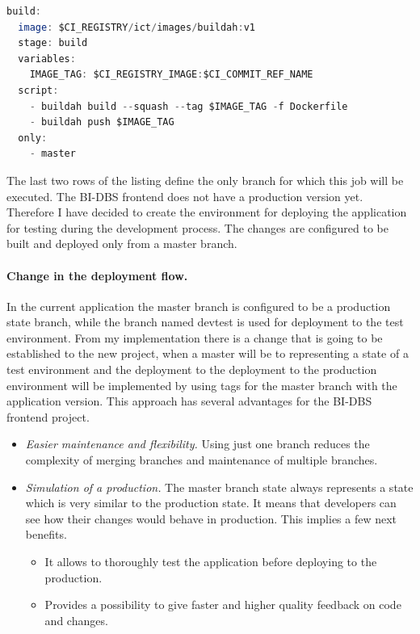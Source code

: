 \begin{lstlisting}[language=Octave, caption=Build stage in the CI/CD pipeline]
build:
  image: $CI_REGISTRY/ict/images/buildah:v1
  stage: build
  variables:
    IMAGE_TAG: $CI_REGISTRY_IMAGE:$CI_COMMIT_REF_NAME
  script:
    - buildah build --squash --tag $IMAGE_TAG -f Dockerfile
    - buildah push $IMAGE_TAG
  only:
    - master
\end{lstlisting}

\noindent The last two rows of the listing define the only branch for which this job will be executed. The BI-DBS frontend does not have a production version yet. Therefore I have decided to create the environment for deploying the application for testing during the development process. The changes are configured to be built and deployed only from a master branch.

\paragraph*{Change in the deployment flow.} In the current application the master branch is configured to be a production state branch, while the branch named devtest is used for deployment to the test environment. From my implementation there is a change that is going to be established to the new project, when a master will be to representing a state of a test environment and the deployment to the deployment to the production environment will be implemented by using tags for the master branch with the application version. This approach has several advantages for the BI-DBS frontend project.

\begin{itemize}
\item \emph{Easier maintenance and  flexibility.} Using just one branch reduces the complexity of merging branches and maintenance of multiple branches. 

\item \emph{Simulation of a production. } The master branch state always represents a state which is very similar to the production state. It means that developers can see how their changes would behave in production. This implies a few next benefits.
\begin{itemize}
    \item It allows to thoroughly test the application before deploying to the\\ production.
    \item Provides a possibility to give faster and higher quality feedback on code and changes.
\end{itemize}
\end{itemize}

